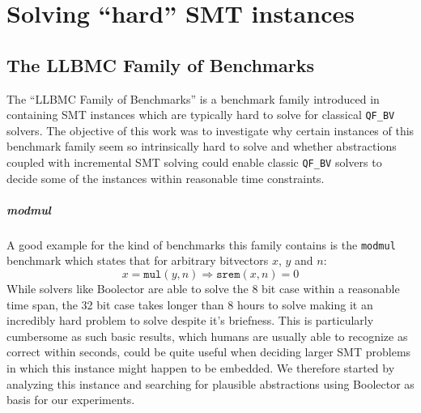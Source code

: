 \chapter{Solving \enquote{hard} SMT instances}
\label{ch:solving_hard_smt}
\section{The LLBMC Family of Benchmarks}
\label{sec:solving_hard_smt:llbmc_benchmarks}
The \enquote{LLBMC Family of Benchmarks} is a benchmark family introduced in \cite{sc2017-proceedings} containing SMT instances which are typically hard to solve for classical \texttt{QF\_BV} solvers. The objective of this work was to investigate why certain instances of this benchmark family seem so intrinsically hard to solve and whether abstractions coupled with incremental SMT solving could enable classic \texttt{QF\_BV} solvers to decide some of the instances within reasonable time constraints.

\paragraph{modmul}
A good example for the kind of benchmarks this family contains is the \texttt{modmul} benchmark which states that for arbitrary bitvectors $x$, $y$ and $n$:
\[
x = \texttt{mul}\left(y,n\right) \Rightarrow \texttt{srem}\left(x,n\right) = 0
\]
While solvers like Boolector are able to solve the 8 bit case within a reasonable time span, the 32 bit case takes longer than 8 hours to solve making it an incredibly hard problem to solve despite it's briefness. This is particularly cumbersome as such basic results, which humans are usually able to recognize as correct within seconds, could be quite useful when deciding larger SMT problems in which this instance might happen to be embedded. We therefore started by analyzing this instance and searching for plausible abstractions using Boolector as basis for our experiments.

